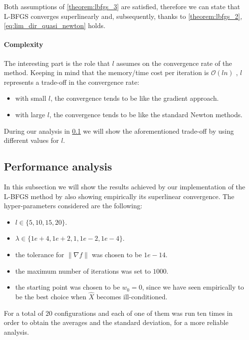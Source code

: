\noindent Both assumptions of \autoref{theorem:lbfgs_3} are satisfied, therefore we can state that L-BFGS converges superlinearly and, subsequently, thanks to \autoref{theorem:lbfgs_2}, \eqref{eq:lim_dir_quasi_newton} holds.

\paragraph{Complexity} The interesting part is the role that $l$ assumes on the convergence rate of the method. Keeping in mind that the memory/time cost per iteration is $\mathcal{O}(ln)$ \cite{nocedal1999numerical}, $l$ represents a trade-off in the convergence rate:
\begin{itemize}
    \item with small $l$, the convergence tends to be like the gradient approach.
    \item with large $l$, the convergence tends to be like the standard Newton methods.
\end{itemize}
During our analysis in \ref{subsec:lbfgs_analysis} we will show the aforementioned trade-off by using different values for $l$.

\subsection{Performance analysis} \label{subsec:lbfgs_analysis}
In this subsection we will show the results achieved by our implementation of the L-BFGS method by also showing empirically its superlinear convergence.
The hyper-parameters considered are the following:
\begin{itemize}
    \item $l \in \{5, 10, 15, 20\}$.
    \item $\lambda \in \{1e+4, 1e+2, 1, 1e-2, 1e-4\}$.
    \item the tolerance for $\lVert \nabla f \rVert$ was chosen to be $1e-14$.
    \item the maximum number of iterations was set to $1000$.
    \item the starting point was chosen to be $w_0=0$, since we have seen empirically to be the best choice when $\hat{X}$ becomes ill-conditioned.
\end{itemize}
For a total of $20$ configurations and each of one of them was run ten times in order to obtain the averages and the standard deviation, for a more reliable analysis.
\vspace{3mm}

